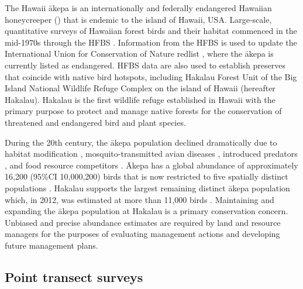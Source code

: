 \documentclass{statsoc}
\newcommand{\akepa}{\textquotesingle\={a}kepa}  %
\newcommand{\Akepa}{\textquotesingle\={A}kepa}  %
\newcommand{\hawaii}{Hawai\textquotesingle i}   %
\begin{document}
The \hawaii{} \akepa{} is an internationally and federally endangered Hawaiian honeycreeper (\citealp{usfws_akepa_1970, birdlife_akepa_2016}) that is endemic to the island of \hawaii{}, USA.  Large-scale, quantitative surveys of Hawaiian forest birds and their habitat commenced in the mid-1970s through the HFBS \citep{scott_HFBS_1986}. Information from the HFBS is used to update the International Union for Conservation of Nature redlist \citep{iucn_redlist_2022}, where the \akepa{} is currently listed as endangered. HFBS data are also used to establish preserves that coincide with native bird hotspots, including Hakalau Forest Unit of the Big Island National Wildlife Refuge Complex on the island of \hawaii{} (hereafter Hakalau).  Hakalau is the first wildlife refuge established in \hawaii{} with the primary purpose to protect and manage native forests for the conservation of threatened and endangered bird and plant species.

During the 20th century, the \akepa{} population declined dramatically due to habitat modification \citep{scott_HFBS_1986, pratt_avifaunal_1994},  mosquito-transmitted avian diseases \citep{pratt_avifaunal_1994, atkinson_wildlife_1995}, introduced predators \citep{lepson_akepa_1997}, and food resource competitors \citep{lepson_akepa_1997}. \Akepa{} has a global abundance of approximately 16,200 (95\%CI 10,000,200) birds that is now restricted to five spatially distinct populations \citep{judge_akepa_2018}. Hakalau supports the largest remaining distinct \akepa{} population which, in 2012, was estimated at more than 11,000 birds \citep{camp_statespace_2016}. Maintaining and expanding the \akepa{} population at Hakalau is a primary conservation concern. Unbiased and precise abundance estimates are required by land and resource managers for the purposes of evaluating management actions and developing future management plans.

\subsection{Point transect surveys}
\end{document}
